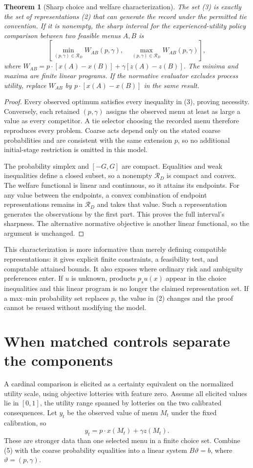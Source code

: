 \documentclass[11pt]{article}
\newtheorem{theorem}{Theorem}
\theoremstyle{remark}
\begin{document}
\begin{theorem}[Sharp choice and welfare characterization]
The set (3) is exactly the set of representations (2) that can generate the record under the permitted tie convention. If it is nonempty, the sharp interval for the experienced-utility policy comparison between two feasible menus $A,B$ is
\[
 \left[\min_{(p,\gamma)\in\mathcal R_D}W_{AB}(p,\gamma),\quad
       \max_{(p,\gamma)\in\mathcal R_D}W_{AB}(p,\gamma)\right],    \tag{4}
\]
where $W_{AB}=p\cdot[x(A)-x(B)]+\gamma[z(A)-z(B)]$.
The minima and maxima are finite linear programs. If the normative evaluator excludes process utility, replace $W_{AB}$ by $p\cdot[x(A)-x(B)]$ in the same result.
\end{theorem}
\begin{proof}
Every observed optimum satisfies every inequality in (3), proving necessity. Conversely, each retained $(p,\gamma)$ assigns the observed menu at least as large a value as every competitor. A tie selector choosing the recorded menu therefore reproduces every problem. Coarse acts depend only on the stated coarse probabilities and are consistent with the same extension $p$, so no additional initial-stage restriction is omitted in this model.

The probability simplex and $[-G,G]$ are compact. Equalities and weak inequalities define a closed subset, so a nonempty $\mathcal R_D$ is compact and convex. The welfare functional is linear and continuous, so it attains its endpoints. For any value between the endpoints, a convex combination of endpoint representations remains in $\mathcal R_D$ and takes that value. Such a representation generates the observations by the first part. This proves the full interval's sharpness. The alternative normative objective is another linear functional, so the argument is unchanged.
\end{proof}

This characterization is more informative than merely defining compatible representations: it gives explicit finite constraints, a feasibility test, and computable attained bounds. It also exposes where ordinary risk and ambiguity preferences enter. If $u$ is unknown, products $p_su(x)$ appear in the choice inequalities and this linear program is no longer the claimed representation set. If a max--min probability set replaces $p$, the value in (2) changes and the proof cannot be reused without modifying the model.

\section{When matched controls separate the components}
A cardinal comparison is elicited as a certainty equivalent on the normalized utility scale, using objective lotteries with feature zero. Assume all elicited values lie in $[0,1]$, the utility range spanned by lotteries on the two calibrated consequences. Let $y_t$ be the observed value of menu $M_t$ under the fixed calibration, so
\[
 y_t=p\cdot x(M_t)+\gamma z(M_t).                        \tag{5}
\]
These are stronger data than one selected menu in a finite choice set. Combine (5) with the coarse probability equalities into a linear system $B\vartheta=b$, where $\vartheta=(p,\gamma)$.
\end{document}
